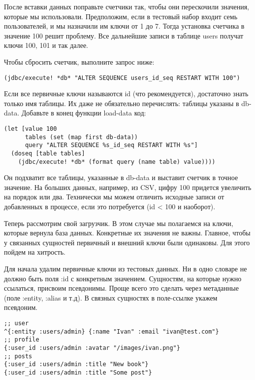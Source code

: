 После вставки данных поправьте счетчики так, чтобы они перескочили значения,
которые мы использовали. Предположим, если в тестовый набор входит семь
пользователей, и мы назначили им ключи от 1 до 7. Тогда установка счетчика в
значение 100 решит проблему. Все дальнейшие записи в таблице users получат ключи
100, 101 и так далее.

Чтобы сбросить счетчик, выполните запрос ниже:

\begin{verbatim}
(jdbc/execute! *db* "ALTER SEQUENCE users_id_seq RESTART WITH 100")
\end{verbatim}

Если все первичные ключи называются id (что рекомендуется), достаточно знать
только имя таблицы. Их даже не обязательно перечислять: таблицы указаны в
db-data. Добавьте в конец функции load-data код:

\begin{verbatim}
(let [value 100
      tables (set (map first db-data))
      query "ALTER SEQUENCE %s_id_seq RESTART WITH %s"]
  (doseq [table tables]
    (jdbc/execute! *db* (format query (name table) value))))
\end{verbatim}

Он подхватит все таблицы, указанные в db-data и выставит счетчик в точное
значение. На больших данных, например, из CSV, цифру 100 придется увеличить на
порядок или два. Технически мы можем отличить исходные записи от добавленных в
процессе, если это потребуется (id < 100 и наоборот).

Теперь рассмотрим свой загрузчик. В этом случае мы полагаемся на ключи, которые
вернула база данных. Конкретные их значения не важны. Главное, чтобы у связанных
сущностей первичный и внешний ключи были одинаковы. Для этого пойдем на
хитрость.

Для начала удалим первичные ключи из тестовых данных. Ни в одно словаре не
должно быть поля :id с конкретным значением. Сущностям, на которые нужно
ссылаться, присвоим псевдонимы. Проще всего это сделать через метаданные (поле
:entity, :alias и т.д). В связных сущностях в поле-ссылке укажем псевдоним.

\begin{verbatim}
;; user
^{:entity :users/admin} {:name "Ivan" :email "ivan@test.com"}
;; profile
{:user_id :users/admin :avatar "/images/ivan.png"}
;; posts
{:user_id :users/admin :title "New book"}
{:user_id :users/admin :title "Some post"}
\end{verbatim}


